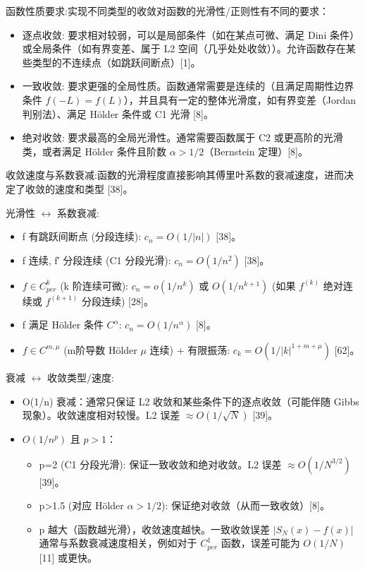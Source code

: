 函数性质要求:实现不同类型的收敛对函数的光滑性/正则性有不同的要求：

\begin{itemize}
	\item 逐点收敛: 要求相对较弱，可以是局部条件（如在某点可微、满足 Dini 条件）或全局条件（如有界变差、属于 L2 空间（几乎处处收敛））。允许函数存在某些类型的不连续点（如跳跃间断点）[1]。
	\item 一致收敛: 要求更强的全局性质。函数通常需要是连续的（且满足周期性边界条件 $f(−L)=f(L)$），并且具有一定的整体光滑度，如有界变差（Jordan 判别法）、满足 Hölder 条件或 C1 光滑 [8]。
	\item 绝对收敛: 要求最高的全局光滑性。通常需要函数属于 C2 或更高阶的光滑类，或者满足 Hölder 条件且阶数 $\alpha>1/2$（Bernstein 定理）[8]。
\end{itemize}

收敛速度与系数衰减:函数的光滑程度直接影响其傅里叶系数的衰减速度，进而决定了收敛的速度和类型 [38]。

光滑性 $\leftrightarrow$ 系数衰减:

\begin{itemize}
	\item f 有跳跃间断点 (分段连续): $c_n=O(1/|n|)$ [38]。
	\item f 连续, f′ 分段连续 (C1 分段光滑): $c_n=O(1/n^2)$ [38]。
	\item $f\in C_{per}^k$ (k 阶连续可微): $c_n=o(1/n^k)$ 或 $O(1/n^{k+1})$ (如果 $f^{(k)}$ 绝对连续或 $f^{(k+1)}$ 分段连续) [28]。
	\item f 满足 Hölder 条件 $C^\alpha$: $c_n=O(1/n^\alpha)$ [8]。
	\item $f\in C^{m,\mu}$ (m阶导数 Hölder $\mu$ 连续) + 有限振荡: $c_k=O(1/|k|^{1+m+\mu})$ [62]。
\end{itemize}

衰减 $\leftrightarrow$ 收敛类型/速度:

\begin{itemize}
	\item O(1/n) 衰减：通常只保证 L2 收敛和某些条件下的逐点收敛（可能伴随 Gibbs 现象）。收敛速度相对较慢。L2 误差 $\approx O(1/\sqrt{N})$ [39]。
	\item $O(1/n^p)$ 且 $p>1$：
	\begin{itemize}
		\item p=2 (C1 分段光滑): 保证一致收敛和绝对收敛。L2 误差 $\approx O(1/N^{3/2})$ [39]。
		\item p>1.5 (对应 Hölder $\alpha>1/2$): 保证绝对收敛（从而一致收敛）[8]。
		\item p 越大（函数越光滑），收敛速度越快。一致收敛误差 $|S_N(x)−f(x)|$ 通常与系数衰减速度相关，例如对于 $C_{per}^1$ 函数，误差可能为 $O(1/N)$ [11] 或更快。
	\end{itemize}
\end{itemize}

